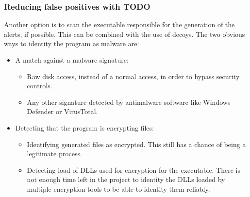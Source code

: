 \subsubsection{Reducing false positives with TODO}
Another option is to scan the executable responsible for the generation of the alerts, if possible.
This can be combined with the use of decoys.
\linej
The two obvious ways to identity the program as malware are:
\begin{itemize}
	\item A match against a malware signature:
	\begin{itemize}
		\item Raw disk access, instead of a normal access, in order to bypass security controls.
		\item Any other signature detected by antimalware software like Windows Defender or VirusTotal.
	\end{itemize}
	\item Detecting that the program is encrypting files:
	\begin{itemize}
		\item Identifying generated files as encrypted. This still has a chance of being a legitimate process.
		\item Detecting load of DLLs used for encryption for the executable. There is not enough time left in the project to identity the DLLs loaded by multiple encryption tools to be able to identity them reliably.
	\end{itemize}
\end{itemize}
\linej

